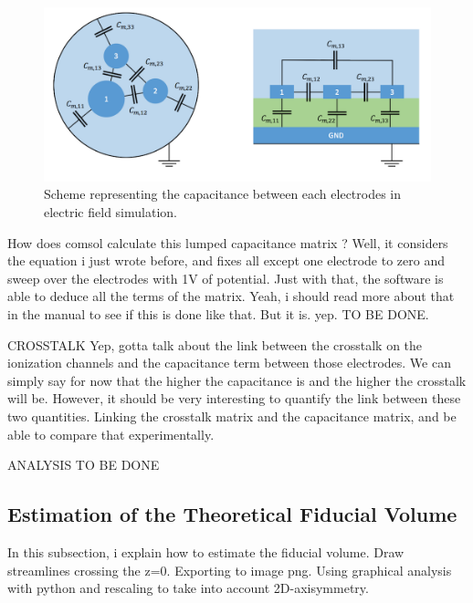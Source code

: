 \begin{figure}
\centering
\includegraphics[width=\linewidth]{Figures/Electrodes/lumped_capacitance_scheme.png}
\caption{Scheme representing the capacitance between each electrodes in electric field simulation.}
\label{fig:lumped-capacitance}
\end{figure}

How does comsol calculate this lumped capacitance matrix ?
Well, it considers the equation i just wrote before, and fixes all except one electrode to zero and sweep over the electrodes with 1V of potential. Just with that, the software is able to deduce all the terms of the matrix.
Yeah, i should read more about that in the manual to see if this is done like that. But it is. yep.
TO BE DONE.


CROSSTALK
Yep, gotta talk about the link between the crosstalk on the ionization channels and the capacitance term between those electrodes.
We can simply say for now that the higher the capacitance is and the higher the crosstalk will be. However, it should be very interesting to quantify the link between these two quantities.
Linking the crosstalk matrix and the capacitance matrix, and be able to compare that experimentally.

ANALYSIS TO BE DONE


\subsection{Estimation of the Theoretical Fiducial Volume}

In this subsection, i explain how to estimate the fiducial volume.
Draw streamlines crossing the z=0.
Exporting to image png.
Using graphical analysis with python and rescaling to take into account 2D-axisymmetry.

